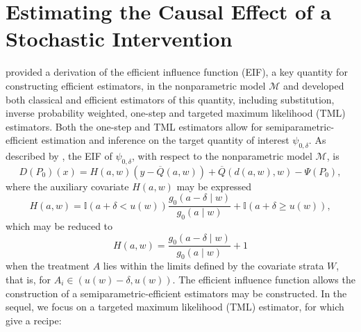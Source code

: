 \documentclass[
  12pt, krantz2,
]{krantz}
\theoremstyle{definition}
\theoremstyle{definition}
\theoremstyle{definition}
\newcommand{\M}{\mathcal{M}}
\newcommand{\1}{\mathbbm{1}}
\begin{document}
\hypertarget{estimating-the-causal-effect-of-a-stochastic-intervention}{%
\section{Estimating the Causal Effect of a Stochastic Intervention}\label{estimating-the-causal-effect-of-a-stochastic-intervention}}

\citet{diaz2012population} provided a derivation of the efficient influence function
(EIF), a key quantity for constructing efficient estimators, in the
nonparametric model \(\M\) and developed both classical and efficient estimators
of this quantity, including substitution, inverse probability weighted, one-step
and targeted maximum likelihood (TML) estimators. Both the one-step and TML
estimators allow for semiparametric-efficient estimation and inference on the
target quantity of interest \(\psi_{0, \delta}\). As described by
\citet{diaz2018stochastic}, the EIF of \(\psi_{0, \delta}\), with respect to the
nonparametric model \(\M\), is
\begin{equation}
  D(P_0)(x) = H(a, w)({y - \overline{Q}(a, w)}) +
  \overline{Q}(d(a, w), w) - \Psi(P_0),
  \label{eq:eif-shift}
\end{equation}
where the auxiliary covariate \(H(a,w)\) may be expressed
\begin{equation}
  H(a,w) = \mathbb{I}(a + \delta < u(w)) \frac{g_0(a - \delta \mid w)}
  {g_0(a \mid w)} + \mathbb{I}(a + \delta \geq u(w)),
  \label{eq:aux-covar-full-shift}
\end{equation}
which may be reduced to
\begin{equation}
  H(a,w) = \frac{g_0(a - \delta \mid w)}{g_0(a \mid w)} + 1
  \label{eq:aux-covar-simple-shift}
\end{equation}
when the treatment \(A\) lies within the limits defined by the covariate strata
\(W\), that is, for \(A_i \in (u(w) - \delta, u(w))\). The efficient influence
function allows the construction of a semiparametric-efficient estimators may be
constructed. In the sequel, we focus on a targeted maximum likelihood (TML)
estimator, for which \citet{diaz2018stochastic} give a recipe:
\end{document}
